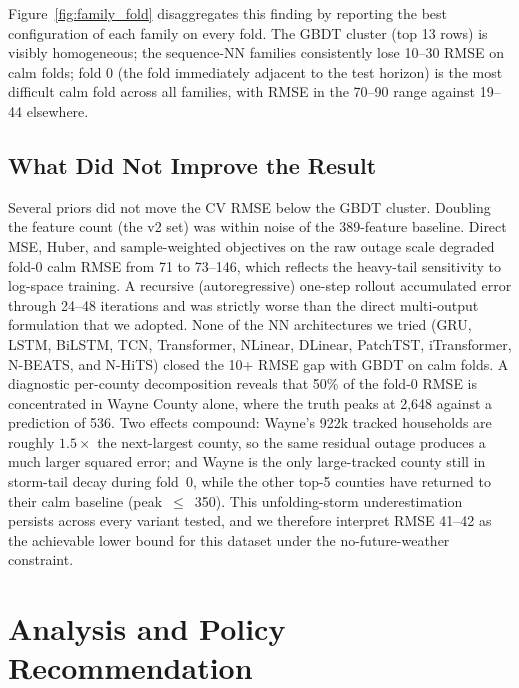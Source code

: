 \documentclass[11pt]{article}
\begin{document}
Figure~\ref{fig:family_fold} disaggregates this finding by reporting
the best configuration of each family on every fold. The GBDT cluster
(top 13 rows) is visibly homogeneous; the sequence-NN families
consistently lose 10--30 RMSE on calm folds; fold 0 (the fold
immediately adjacent to the test horizon) is the most difficult calm
fold across all families, with RMSE in the 70--90 range against 19--44
elsewhere.




\subsection{What Did Not Improve the Result}
\label{sec:negative}
Several priors did not move the CV RMSE below the GBDT cluster.
Doubling the feature count (the v2 set) was within noise of the
389-feature baseline. Direct MSE, Huber, and sample-weighted objectives
on the raw outage scale degraded fold-0 calm RMSE from 71 to 73--146,
which reflects the heavy-tail sensitivity to log-space training. A
recursive (autoregressive) one-step rollout accumulated error through
24--48 iterations and was strictly worse than the direct multi-output
formulation that we adopted. None of the NN architectures we tried
(GRU, LSTM, BiLSTM, TCN, Transformer, NLinear, DLinear, PatchTST,
iTransformer, N-BEATS, and N-HiTS) closed the 10+ RMSE gap with GBDT
on calm folds. A diagnostic per-county decomposition reveals that 50\%
of the fold-0 RMSE is concentrated in Wayne County alone, where the
truth peaks at 2{,}648 against a prediction of 536. Two effects
compound: Wayne's 922k tracked households are roughly $1.5\times$ the
next-largest county, so the same residual outage produces a much
larger squared error; and Wayne is the only large-tracked county still
in storm-tail decay during fold~0, while the other top-5 counties have
returned to their calm baseline (peak~$\le$~350). This
unfolding-storm underestimation persists across every variant tested,
and we therefore interpret RMSE 41--42 as the achievable lower bound
for this dataset under the no-future-weather constraint.

\section{Analysis and Policy Recommendation}
\label{sec:policy}
\end{document}
